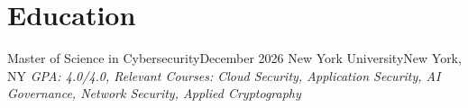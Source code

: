 \documentclass{resume}
\begin{document}



\section{Education}
  \resumeEntryStart
    \resumeEntryTSDL
    {Master of Science in Cybersecurity}{December 2026}
    {New York University}{New York, NY}
      {\newline{}\newline{}\scriptsize \textit{ \footnotesize{GPA: 4.0/4.0, Relevant Courses: Cloud Security, Application Security, AI Governance, Network Security, Applied Cryptography}}}
\resumeEntryEnd
\end{document}
